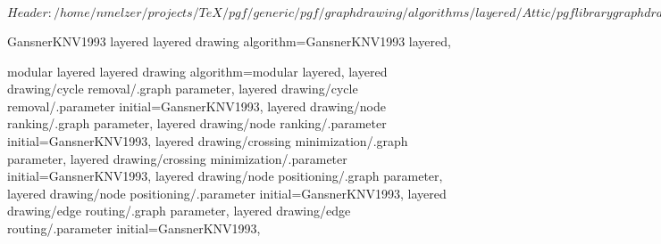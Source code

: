 %
%
%

\ProvidesFileRCS[v\pgfversion] $Header: /home/nmelzer/projects/TeX/pgf/generic/pgf/graphdrawing/algorithms/layered/Attic/pgflibrarygraphdrawing.layered.code.tex,v 1.6 2011/10/16 08:40:10 jannis-pohlmann Exp $





%
% 




%
%



%
%
%
\pgfgddeclarealgorithmkey
  {GansnerKNV1993 layered}
  {layered drawing}
  {
    algorithm=GansnerKNV1993 layered,
  }


%
%
\pgfgddeclarealgorithmkey
  {modular layered}
  {layered drawing}
  {
    algorithm=modular layered,
    layered drawing/cycle removal/.graph parameter,
    layered drawing/cycle removal/.parameter initial=GansnerKNV1993,
    layered drawing/node ranking/.graph parameter,
    layered drawing/node ranking/.parameter initial=GansnerKNV1993,
    layered drawing/crossing minimization/.graph parameter,
    layered drawing/crossing minimization/.parameter initial=GansnerKNV1993,
    layered drawing/node positioning/.graph parameter,
    layered drawing/node positioning/.parameter initial=GansnerKNV1993,
    layered drawing/edge routing/.graph parameter,
    layered drawing/edge routing/.parameter initial=GansnerKNV1993,
  }

\endinput
